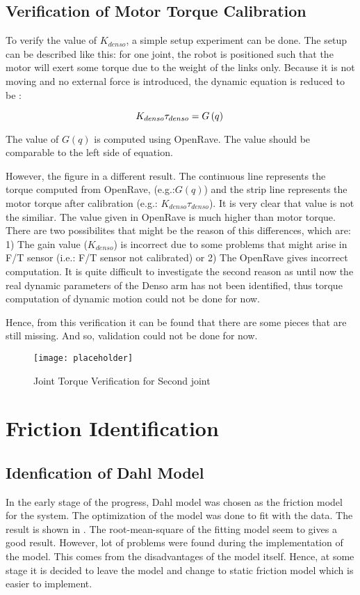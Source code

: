 \subsection{Verification of Motor Torque Calibration}
To verify the value of $K_{denso}$, a simple setup experiment can be done. The setup can be described like this: for one joint, the robot is positioned such that the motor will exert some torque due to the weight of the links only. Because it is not moving and no external force is introduced, the dynamic equation is reduced to be :

\begin{equation}
  K_{denso} \tau_{denso} = G\left(q \right) \\
\end{equation}

The value of $G\left(q \right)$ is computed using OpenRave. The value should be comparable to the left side of equation. 

However, the figure in  a different result. The continuous line represents the torque computed from OpenRave, (e.g.:$G\left(q \right)$) and the strip line represents the motor torque after calibration (e.g.: $K_{denso} \tau_{denso}$). It is very clear that value is not the similiar. The value given in OpenRave is much higher than motor torque. There are two possibilites that might be the reason of this differences, which are: 1) The gain value ($ K_{denso} $) is incorrect due to some problems that might arise in F/T sensor (i.e.: F/T sensor not calibrated) or 2) The OpenRave gives incorrect computation. It is quite difficult to investigate the second reason as until now the real dynamic parameters of the Denso arm has not been identified, thus torque computation of dynamic motion could not be done for now. 

Hence, from this verification it can be found that there are some pieces that are still missing. And so, validation could not be done for now.
 
\begin{figure}[h]
    \centering
    \texttt{[image: placeholder]}
    \caption{Joint Torque Verification for Second joint}
    \label{fig: tor verification}
\end{figure}


\section{Friction Identification}
\subsection{Idenfication of Dahl Model}
In the early stage of the progress, Dahl model was chosen as the friction model for the system. The optimization of the model was done to fit with the data. The result is shown in . The root-mean-square of the fitting model seem to gives a good result. However, lot of problems were found during the implementation of the model. This comes from the disadvantages of the model itself. Hence, at some stage it is decided to leave the model and change to static friction model which is easier to implement.

